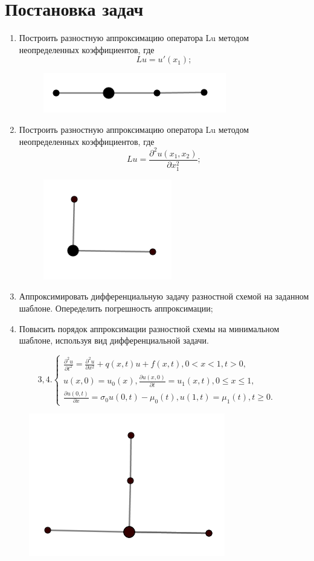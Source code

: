 \documentclass[11pt]{article}
\begin{document}
    \section*{Постановка
задач}\label{ux43fux43eux441ux442ux430ux43dux43eux432ux43aux430-ux437ux430ux434ux430ux447}
\begin{enumerate}
    \item Построить разностную аппроксимацию оператора Lu методом неопределенных коэффициентов, где $$Lu=u'(x_1);$$
    \begin{figure}
        \centering
        \includegraphics[width=0.35\linewidth]{image1.png}
    \end{figure}
    \item Построить разностную аппроксимацию оператора Lu методом неопределенных коэффициентов, где $$Lu=\frac{\partial^2 u(x_1,x_2)}{\partial x_1^2};$$
    \begin{figure}
        \centering
        \includegraphics[width=0.25\linewidth]{image2.png}
    \end{figure}
    \item Аппроксимировать дифференциальную задачу разностной схемой на заданном шаблоне. Опеределить погрешность аппроксимации;
    \item Повысить порядок аппроксимации разностной схемы на минимальном шаблоне, используя вид дифференциальной задачи.
\end{enumerate}
$$3,4.\begin{cases}
    \frac{\partial^2 u}{\partial t^2}=\frac{\partial^2 u}{\partial x^2}+q(x,t)u+f(x,t), 0<x<1,t>0,\\
    u(x,0)=u_0(x),\frac{\partial u(x,0)}{\partial t}=u_1(x,t), 0 \leq x \leq 1,\\
    \frac{\partial u(0,t)}{\partial x}=\sigma_0 u(0,t)-\mu_0(t),u(1,t)=\mu_1(t),t\geq0.
\end{cases}$$
\begin{figure}
    \centering
    \includegraphics[width=0.35\linewidth]{image3.png}
\end{figure}
\newpage
\end{document}
